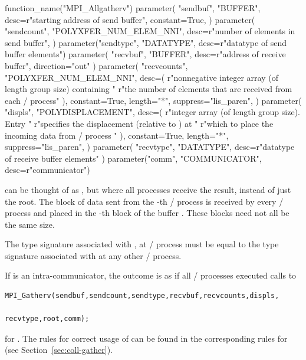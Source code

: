 \begin{mpi-binding}
    function_name("MPI_Allgatherv")
    parameter(
        "sendbuf",
        "BUFFER",
        desc=r"starting address of send buffer",
        constant=True,
    )
    parameter(
        "sendcount",
        "POLYXFER_NUM_ELEM_NNI",
        desc=r"number of elements in send buffer",
    )
    parameter("sendtype", "DATATYPE", desc=r"datatype of send buffer elements")
    parameter(
        "recvbuf", "BUFFER", desc=r"address of receive buffer", direction="out"
    )
    parameter(
        "recvcounts",
        "POLYXFER_NUM_ELEM_NNI",
        desc=(
            r"nonnegative integer array (of length group size) containing "
            r"the number of elements that are received from each \MPI/ process"
        ),
        constant=True,
        length="*",
        suppress="lis_paren",
    )
    parameter(
        "displs",
        "POLYDISPLACEMENT",
        desc=(
            r"integer array (of length group size). Entry  "
            r"specifies the displacement (relative to ) at "
            r"which to place the incoming data from \MPI/ process "
        ),
        constant=True,
        length="*",
        suppress="lis_paren",
    )
    parameter(
        "recvtype", "DATATYPE", desc=r"datatype of receive buffer elements"
    )
    parameter("comm", "COMMUNICATOR", desc=r"communicator")
\end{mpi-binding}

 can be thought of as , but
where all processes receive the result, instead of just the root.
The block of data sent from the
-th
\MPI/ process is received by every \MPI/ process and placed in the
-th
block of the buffer .
These blocks need not all be the same size.


The type signature associated with ,
at \MPI/ process  must be equal to the type signature associated with
 at any other \MPI/ process.

If  is an intra-communicator,
the outcome is as if all \MPI/ processes executed calls to
\begin{lstlisting}[language={[MPI]C}]
    MPI_Gatherv(sendbuf,sendcount,sendtype,recvbuf,recvcounts,displs,
                                                   recvtype,root,comm);
\end{lstlisting}
for .  The rules for correct usage of
 can be found in the corresponding rules
for  (see Section~\ref{sec:coll-gather}).

